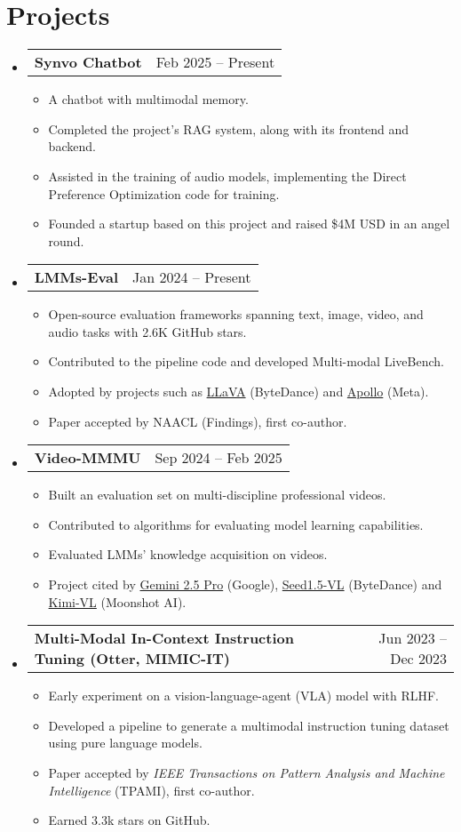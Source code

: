 \documentclass[letterpaper,10pt]{article}
\makeatletter
\newcommand{\resumeItem}[1]{
  \item\small{
    {#1 \vspace{-2pt}}
  }
}
\newcommand{\resumeProjectHeading}[2]{
    \item
    \begin{tabular*}{0.97\textwidth}{l@{\extracolsep{\fill}}r}
      \small#1 & #2 \\
    \end{tabular*}\vspace{-7pt}
}
\newcommand{\resumeSubHeadingListStart}{\begin{itemize}[leftmargin=0.15in, label={}]}
\newcommand{\resumeSubHeadingListEnd}{\end{itemize}}
\newcommand{\resumeItemListStart}{\begin{itemize}}
\newcommand{\resumeItemListEnd}{\end{itemize}\vspace{-5pt}}
\makeatother
\begin{document}
\section{Projects}
    \resumeSubHeadingListStart
      \resumeProjectHeading
          {\textbf{Synvo Chatbot}}{Feb 2025 -- Present}
          \resumeItemListStart
            \resumeItem{A chatbot with multimodal memory.}
            \resumeItem{Completed the project's RAG system, along with its frontend and backend.}
            \resumeItem{Assisted in the training of audio models, implementing the Direct Preference Optimization code for training.}
            \resumeItem{Founded a startup based on this project and raised \$4M USD in an angel round.}
          \resumeItemListEnd
      \resumeProjectHeading
          {\textbf{LMMs-Eval}}{Jan 2024 -- Present}
          \resumeItemListStart
            \resumeItem{Open-source evaluation frameworks spanning text, image, video, and audio tasks with 2.6K GitHub stars.}
            \resumeItem{Contributed to the pipeline code and developed Multi-modal LiveBench.}
            \resumeItem{Adopted by projects such as \href{https://llava-vl.github.io/blog/2024-08-05-llava-onevision/}{LLaVA} (ByteDance) and \href{https://apollo-lmms.github.io/}{Apollo} (Meta).}
            \resumeItem{Paper accepted by NAACL (Findings), first co-author.}
          \resumeItemListEnd
      \resumeProjectHeading
          {\textbf{Video-MMMU}}{Sep 2024 -- Feb 2025}
          \resumeItemListStart
            \resumeItem{Built an evaluation set on multi-discipline professional videos.}
            \resumeItem{Contributed to algorithms for evaluating model learning capabilities.}
            \resumeItem{Evaluated LMMs' knowledge acquisition on videos.}
            \resumeItem{Project cited by \href{https://deepmind.google/models/gemini/pro/}{Gemini 2.5 Pro} (Google), \href{https://arxiv.org/pdf/2505.07062}{Seed1.5-VL} (ByteDance) and \href{https://arxiv.org/abs/2504.07491}{Kimi-VL} (Moonshot AI).}
          \resumeItemListEnd
      \resumeProjectHeading
          {\textbf{Multi-Modal In-Context Instruction Tuning (Otter, MIMIC-IT)}}{Jun 2023 -- Dec 2023}
          \resumeItemListStart
            \resumeItem{Early experiment on a vision-language-agent (VLA) model with RLHF.}
            \resumeItem{Developed a pipeline to generate a multimodal instruction tuning dataset using pure language models.}
            \resumeItem{Paper accepted by \textit{IEEE Transactions on Pattern Analysis and Machine Intelligence} (TPAMI), first co-author.}
            \resumeItem{Earned 3.3k stars on GitHub.}
          \resumeItemListEnd
    \resumeSubHeadingListEnd
\end{document}
